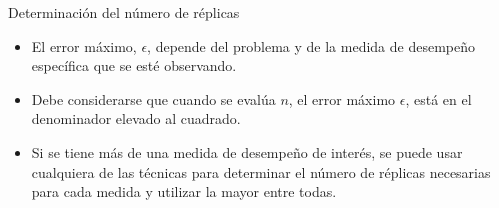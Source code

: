 \begin{frame}{Determinación del número de réplicas}
    \begin{itemize}
        \item El error máximo, $\epsilon$, depende del problema y de la medida de desempeño específica que se esté observando. %
        \item Debe considerarse que cuando se evalúa $n$, el error máximo $\epsilon$, está en el denominador elevado al cuadrado. %
        \item Si se tiene más de una medida de desempeño de interés, se puede usar cualquiera de las técnicas para determinar el número de réplicas necesarias para cada medida y utilizar la mayor entre todas. %
    \end{itemize}
\end{frame}


